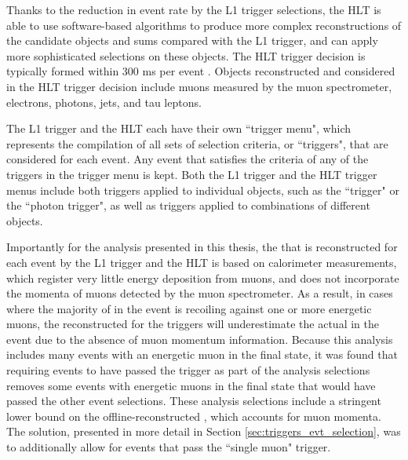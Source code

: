 Thanks to the reduction in event rate by the L1 trigger selections, the HLT is able to use software-based algorithms to produce more complex reconstructions of the candidate objects and sums compared with the L1 trigger, and can apply more sophisticated selections on these objects. The HLT trigger decision is typically formed within 300 ms per event \cite{ATLAS_Trigger}. Objects reconstructed and considered in the HLT trigger decision include muons measured by the muon spectrometer, electrons, photons, jets, \met and tau leptons. 

The L1 trigger and the HLT each have their own ``trigger menu", which represents the compilation of all sets of selection criteria, or ``triggers", that are considered for each event. Any event that satisfies the criteria of any of the triggers in the trigger menu is kept. Both the L1 trigger and the HLT trigger menus include both triggers applied to individual objects, such as the ``\met trigger" or the ``photon trigger", as well as triggers applied to combinations of different objects.

Importantly for the analysis presented in this thesis, the \met that is reconstructed for each event by the L1 trigger and the HLT is based on calorimeter measurements, which register very little energy deposition from muons, and does not incorporate the momenta of muons detected by the muon spectrometer. As a result, in cases where the majority of \met in the event is recoiling against one or more energetic muons, the \met reconstructed for the triggers will underestimate the actual \met in the event due to the absence of muon momentum information. Because this analysis includes many events with an energetic muon in the final state, it was found that requiring events to have passed the \met trigger as part of the analysis selections removes some events with energetic muons in the final state that would have passed the other event selections. These analysis selections include a stringent lower bound on the offline-reconstructed \met, which accounts for muon momenta. The solution, presented in more detail in Section \ref{sec:triggers_evt_selection}, was to additionally allow for events that pass the ``single muon" trigger.


